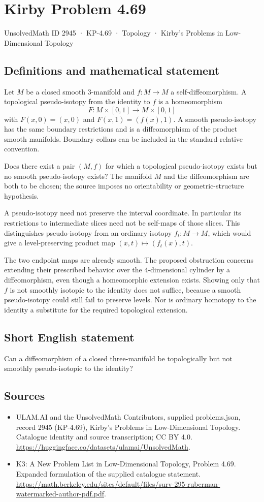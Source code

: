 \documentclass[11pt,a4paper]{article}
\begin{document}
\section*{Kirby Problem 4.69}\label{2945}
{\small UnsolvedMath ID 2945 · KP-4.69 · Topology · Kirby's Problems in Low-Dimensional Topology}
\subsection{Definitions and mathematical statement}
Let $M$ be a closed smooth $3$-manifold and $f:M\to M$ a
self-diffeomorphism. A topological pseudo-isotopy from the identity
to $f$ is a homeomorphism
\[
 F:M\times[0,1]\longrightarrow M\times[0,1]
\]
with $F(x,0)=(x,0)$ and $F(x,1)=(f(x),1)$.
A smooth pseudo-isotopy has the same boundary restrictions and is
a diffeomorphism of the product smooth manifolds. Boundary collars
can be included in the standard relative convention.

Does there exist a pair $(M,f)$ for which a topological
pseudo-isotopy exists but no smooth pseudo-isotopy exists? The
manifold $M$ and the diffeomorphism are both to be chosen; the
source imposes no orientability or geometric-structure hypothesis.

A pseudo-isotopy need not preserve the interval coordinate. In
particular its restrictions to intermediate slices need not be
self-maps of those slices. This distinguishes pseudo-isotopy from an
ordinary isotopy $f_t:M\to M$, which would give a level-preserving
product map $(x,t)\mapsto(f_t(x),t)$.

The two endpoint maps are already smooth. The proposed obstruction
concerns extending their prescribed behavior over the $4$-dimensional
cylinder by a diffeomorphism, even though a homeomorphic extension
exists. Showing only that $f$ is not smoothly isotopic to the
identity does not suffice, because a smooth pseudo-isotopy could
still fail to preserve levels. Nor is ordinary homotopy to the
identity a substitute for the required topological extension.
\subsection{Short English statement}
Can a diffeomorphism of a closed three-manifold be topologically but not smoothly pseudo-isotopic to the identity?
\subsection{Sources}
\begin{itemize}
\item[S1] ULAM.AI and the UnsolvedMath Contributors, supplied problems.json, record 2945 (KP-4.69), Kirby's Problems in Low-Dimensional Topology. Catalogue identity and source transcription; CC BY 4.0.
\url{https://huggingface.co/datasets/ulamai/UnsolvedMath}.
\item[S2] K3: A New Problem List in Low-Dimensional Topology, Problem 4.69. Expanded formulation of the supplied catalogue statement.
\url{https://math.berkeley.edu/sites/default/files/surv-295-ruberman-watermarked-author-pdf.pdf}.
\end{itemize}
\end{document}
